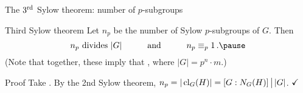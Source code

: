 \documentclass[8pt]{beamer}
\newcommand{\Pause}{\pause}      %
\begin{document}
\begin{frame}{The $3^{\rm rd}$ Sylow theorem: number of $p$-subgroups}

  \begin{block}{Third Sylow theorem}
    Let $n_p$ be the number of Sylow $p$-subgroups of $G$.  Then
    \[
    \mbox{$n_p$ divides $|G|$}\qquad\quad\mbox{and}\qquad\quad
    n_p\equiv_p 1\,. \vspace{-2mm}\Pause
    \]
    (Note that together, these imply that , where
    $|G|=p^n\cdot m$.)
  \end{block}

  \Pause

  \begin{exampleblock}{Proof} %
    Take . By the 2nd Sylow theorem,
    $n_p=|\operatorname{cl}_G(H)|=[G:N_G(H)]\,\big|\,|G|$. $\hfill\checkmark$ \medskip\Pause
    

\end{exampleblock}
\end{frame}
\end{document}
